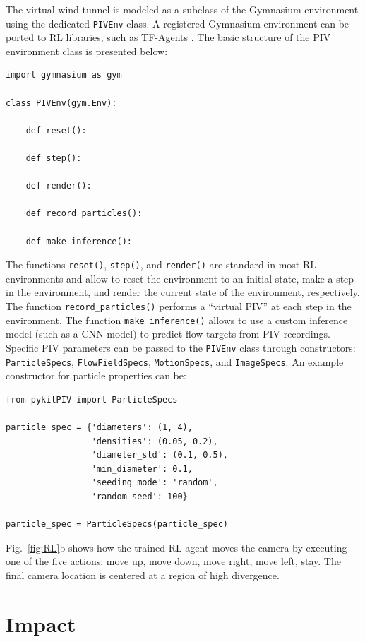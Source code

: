 \documentclass[a4paper,fleqn]{cas-dc}
\begin{document}
The virtual wind tunnel is modeled as a subclass of the Gymnasium environment \cite{brockman2016openai} using the dedicated \texttt{PIVEnv} class. A registered Gymnasium environment can be ported to RL libraries, such as TF-Agents \cite{TFAgents}. The basic structure of the PIV environment class is presented below:
\lstset{language=Python}
\begin{lstlisting}
import gymnasium as gym

class PIVEnv(gym.Env):

	def reset():

	def step():

	def render():

	def record_particles():

	def make_inference():

\end{lstlisting}
The functions \texttt{reset()}, \texttt{step()}, and \texttt{render()} are standard in most RL environments and allow to reset the environment to an initial state, make a step in the environment, and render the current state of the environment, respectively.
The function \texttt{record\_particles()} performs a ``virtual PIV'' at each step in the environment. The function \texttt{make\_inference()} allows to use a custom inference model (such as a CNN model) to predict flow targets from PIV recordings. 
Specific PIV parameters can be passed to the \texttt{PIVEnv} class through constructors: \\
\texttt{ParticleSpecs}, \texttt{FlowFieldSpecs}, \texttt{MotionSpecs}, and \texttt{ImageSpecs}. An example constructor for particle properties can be:
\lstset{language=Python}
\begin{lstlisting}
from pykitPIV import ParticleSpecs

particle_spec = {'diameters': (1, 4),
                 'densities': (0.05, 0.2),
                 'diameter_std': (0.1, 0.5),
                 'min_diameter': 0.1,
                 'seeding_mode': 'random',
                 'random_seed': 100}
                 
particle_spec = ParticleSpecs(particle_spec)
\end{lstlisting}
Fig.~\ref{fig:RL}b shows how the trained RL agent moves the camera by executing one of the five actions: move up, move down, move right, move left, stay. The final camera location is centered at a region of high divergence.

\section{Impact} \label{sec:results}
\end{document}

